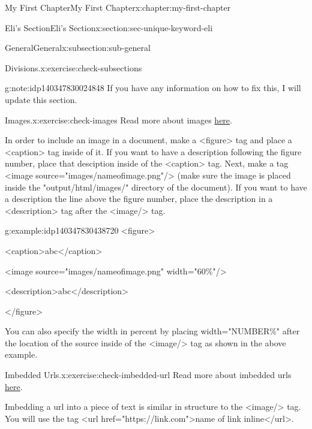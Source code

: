 \documentclass[oneside,10pt,]{book}
\numberwithin{equation}{section}
\begin{document}
\begin{chapterptx}{My First Chapter}{}{My First Chapter}{}{}{x:chapter:my-first-chapter}
\begin{sectionptx}{Eli's Section}{}{Eli's Section}{}{}{x:section:sec-unique-keyword-eli}
\begin{subsectionptx}{General}{}{General}{}{}{x:subsection:sub-general}
\begin{inlineexercise}{Divisions.}{x:exercise:check-subsections}
\begin{note}{}{g:note:idp140347830024848}
If you have any information on how to fix this, I will update this section.\end{note}
%
\end{inlineexercise}
\begin{inlineexercise}{Images.}{x:exercise:check-images}%
Read more about images \href{https://pretextbook.org/doc/guide/html/overview-images.html}{here}.%
\par
In order to include an image in a document, make a \textless{}figure\textgreater{} tag and place a \textless{}caption\textgreater{} tag inside of it. If you want to have a description following the figure number, place that desciption inside of the \textless{}caption\textgreater{} tag. Next, make a tag \textless{}image source="images\slash{}name\textunderscore{}of\textunderscore{}image.png"\slash{}\textgreater{} (make sure the image is placed inside the "output\slash{}html\slash{}images\slash{}" directory of the document). If you want to have a description the line above the figure number, place the description in a \textless{}description\textgreater{} tag after the \textless{}image\slash{}\textgreater{} tag. \begin{example}{}{g:example:idp140347830438720}%
\textless{}figure\textgreater{}%
 \par
\textless{}caption\textgreater{}abc\textless{}\slash{}caption\textgreater{}%
 \par
\textless{}image source="images\slash{}name\textunderscore{}of\textunderscore{}image.png" width="60\%"\slash{}\textgreater{}%
 \par
\textless{}description\textgreater{}abc\textless{}\slash{}description\textgreater{}%
 \par
\textless{}\slash{}figure\textgreater{}%
%
\end{example}
 You can also specify the width in percent by placing width="NUMBER\%" after the location of the source inside of the \textless{}image\slash{}\textgreater{} tag as shown in the above example.%
\end{inlineexercise}
\begin{inlineexercise}{Imbedded Urls.}{x:exercise:check-imbedded-url}%
Read more about imbedded urls \href{https://pretextbook.org/doc/guide/html/topic-url.html}{here}.%
\par
Imbedding a url into a piece of text is similar in structure to the \textless{}image\slash{}\textgreater{} tag. You will use the tag \textless{}url href="https:\slash{}\slash{}link.com"\textgreater{}name of link inline\textless{}\slash{}url\textgreater{}.%

\end{inlineexercise}
\end{subsectionptx}
\end{sectionptx}
\end{chapterptx}
\end{document}
